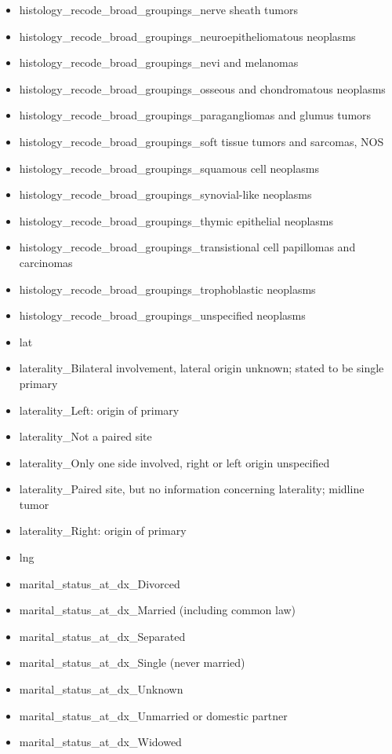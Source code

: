 \documentclass[a4paper,11pt]{article}
\begin{document}
\begin{itemize}[noitemsep]
\item histology\_recode\_broad\_groupings\_nerve sheath tumors
\item histology\_recode\_broad\_groupings\_neuroepitheliomatous neoplasms
\item histology\_recode\_broad\_groupings\_nevi and melanomas
\item histology\_recode\_broad\_groupings\_osseous and chondromatous neoplasms
\item histology\_recode\_broad\_groupings\_paragangliomas and glumus tumors
\item histology\_recode\_broad\_groupings\_soft tissue tumors and sarcomas, NOS
\item histology\_recode\_broad\_groupings\_squamous cell neoplasms
\item histology\_recode\_broad\_groupings\_synovial-like neoplasms
\item histology\_recode\_broad\_groupings\_thymic epithelial neoplasms
\item histology\_recode\_broad\_groupings\_transistional cell papillomas and carcinomas
\item histology\_recode\_broad\_groupings\_trophoblastic neoplasms
\item histology\_recode\_broad\_groupings\_unspecified neoplasms
\item lat
\item laterality\_Bilateral involvement, lateral origin unknown; stated to be single primary
\item laterality\_Left: origin of primary
\item laterality\_Not a paired site
\item laterality\_Only one side involved, right or left origin unspecified
\item laterality\_Paired site, but no information concerning laterality; midline tumor
\item laterality\_Right: origin of primary
\item lng
\item marital\_status\_at\_dx\_Divorced
\item marital\_status\_at\_dx\_Married (including common law)
\item marital\_status\_at\_dx\_Separated
\item marital\_status\_at\_dx\_Single (never married)
\item marital\_status\_at\_dx\_Unknown
\item marital\_status\_at\_dx\_Unmarried or domestic partner
\item marital\_status\_at\_dx\_Widowed

\end{itemize}
\end{document}
